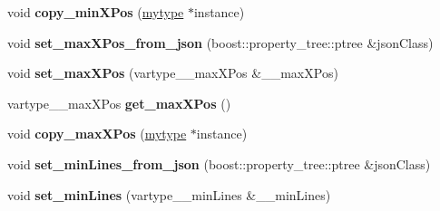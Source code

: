 \begin{DoxyCompactItemize}
\item 
\mbox{\label{classfilter_1_1_algos_1_1_i_d_plate_identifier_ac1c49fff537cee13c5331e98edd3aabb}} 
void {\bfseries copy\+\_\+min\+X\+Pos} (\hyperlink{classfilter_1_1_algos_1_1_i_d_plate_identifier}{mytype} $\ast$instance)
\item 
\mbox{\label{classfilter_1_1_algos_1_1_i_d_plate_identifier_a64b6955fc643e26f139c7df6ce7aec17}} 
void {\bfseries set\+\_\+max\+X\+Pos\+\_\+from\+\_\+json} (boost\+::property\+\_\+tree\+::ptree \&json\+Class)
\item 
\mbox{\label{classfilter_1_1_algos_1_1_i_d_plate_identifier_ab2efb805c4b3c62006573f219a1490f3}} 
void {\bfseries set\+\_\+max\+X\+Pos} (vartype\+\_\+\+\_\+max\+X\+Pos \&\+\_\+\+\_\+max\+X\+Pos)
\item 
\mbox{\label{classfilter_1_1_algos_1_1_i_d_plate_identifier_af7e24241704e6d4cf8350ea8fed0072d}} 
vartype\+\_\+\+\_\+max\+X\+Pos {\bfseries get\+\_\+max\+X\+Pos} ()
\item 
\mbox{\label{classfilter_1_1_algos_1_1_i_d_plate_identifier_ac3ed41714a3a3864c992ce9f84ab9c4d}} 
void {\bfseries copy\+\_\+max\+X\+Pos} (\hyperlink{classfilter_1_1_algos_1_1_i_d_plate_identifier}{mytype} $\ast$instance)
\item 
\mbox{\label{classfilter_1_1_algos_1_1_i_d_plate_identifier_a92b563d76274cab723d7e5e33bc499b2}} 
void {\bfseries set\+\_\+min\+Lines\+\_\+from\+\_\+json} (boost\+::property\+\_\+tree\+::ptree \&json\+Class)
\item 
\mbox{\label{classfilter_1_1_algos_1_1_i_d_plate_identifier_a74a641ed0945592bfb351eee3b8e9a42}} 
void {\bfseries set\+\_\+min\+Lines} (vartype\+\_\+\+\_\+min\+Lines \&\+\_\+\+\_\+min\+Lines)
\item 
\mbox{\label{classfilter_1_1_algos_1_1_i_d_plate_identifier_a5e224f6ac242bd8a1513285105029d0c}} 

\end{DoxyCompactItemize}
